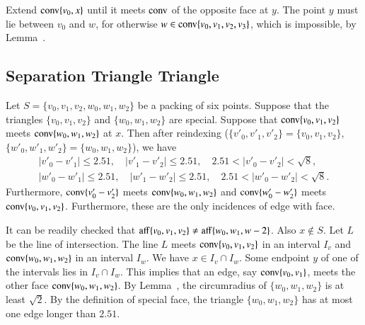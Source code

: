 \begin{tarskidata}
\begin{tarski}
\begin{proved}  Extend ${\operatorname{conv}}\{v_0,x\}$ until it meets
${\operatorname{conv}}$ of the opposite face at $y$.  The point $y$ must lie between
$v_0$ and $w$, for otherwise $w\in{\operatorname{conv}}\{v_0,v_1,v_2,v_3\}$,
which is impossible, by Lemma~.
\swallowed\end{proved}
\end{tarski}







\begin{tarski}
\section{Separation Triangle Triangle}

\begin{lemma}
Let $S=\{v_0,v_1,v_2,w_0,w_1,w_2\}$ be a packing of six points. 
Suppose that the triangles $\{v_0,v_1,v_2\}$ and $\{w_0,w_1,w_2\}$
are special.  Suppose that ${\operatorname{conv}}\{v_0,v_1,v_2\}$ meets
${\operatorname{conv}}\{w_0,w_1,w_2\}$ at $x$.  Then after reindexing
($\{v'_0,v'_1,v'_2\}=\{v_0,v_1,v_2\}$, $\{w'_0,w'_1,w'_2\} = \{w_0,w_1,w_2\}$),
we have 
   $$
   \begin{array}{lll}
   |v'_0-v'_1|\le 2.51,\quad |v'_1-v'_2|\le 2.51,\quad 2.51 < |v'_0-v'_2|<\sqrt8,\\
   |w'_0-w'_1|\le 2.51,\quad |w'_1-w'_2|\le 2.51,\quad 2.51 < |w'_0-w'_2|<\sqrt8.
   \end{array}
   $$
Furthermore, ${\operatorname{conv}}\{v'_0-v'_2\}$ meets ${\operatorname{conv}}\{w_0,w_1,w_2\}$
and  ${\operatorname{conv}}\{w'_0-w'_2\}$ meets ${\operatorname{conv}}\{v_0,v_1,v_2\}$.
Furthermore, these are the only incidences of edge with face.
\end{lemma}

\begin{proved}
It can be readily checked that ${\operatorname{aff}}\{v_0,v_1,v_2\}\ne
{\operatorname{aff}}\{w_0,w_1,w-2\}$.  Also $x\not\in S$.
Let $L$ be the line of intersection.
The line $L$ meets ${\operatorname{conv}}\{v_0,v_1,v_2\}$ in an interval $I_v$
and ${\operatorname{conv}}\{w_0,w_1,w_2\}$ in an interval $I_w$.  We have
$x\in I_v\cap I_w$.  Some endpoint $y$ of one of the intervals lies
in $I_v\cap I_w$.  This implies that an edge, say ${\operatorname{conv}}\{v_0,v_1\}$,
meets the other face ${\operatorname{conv}}\{w_0,w_1,w_2\}$.  
By Lemma~,
the circumradius of $\{w_0,w_1,w_2\}$ is at least $\sqrt2$.  By
the definition of special face, the triangle $\{w_0,w_1,w_2\}$
has at most one edge longer than $2.51$.


\end{proved}
\end{tarski}
\end{tarskidata}
